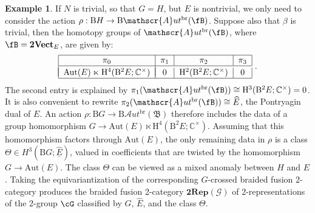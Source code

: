 \documentclass[11pt,reqno]{amsart}
\DeclareMathOperator{\br}{br}
\newcommand{\tVect}{\mathbf{2Vect}}
\newcommand{\sAut}{\mathscr{A}ut}
\newcommand{\rH}{\mathrm{H}}
\newcommand{\rB}{\mathrm{B}}
\numberwithin{equation}{section}
\theoremstyle{plain}
\theoremstyle{definition}
\newtheorem{ex}[equation]{Example}
\begin{document}
\begin{ex}
If $N$ is trivial, so that $G=H$, but $E$ is nontrivial, we only need to consider the action $\rho:\rB H \rightarrow \rB\sAut^{\br}(\fB)$. Suppose also that $\beta$ is trivial, then the homotopy groups of $\sAut^{\br}(\fB)$, where $\fB = \tVect_E$, are given by:
\begin{equation}\label{eq:groupsAutB}
    \begin{tabular}{|c|c|c|c|c|}
\hline
$\pi_0$ & $\pi_1$ & $\pi_2$ & $\pi_3$\\
\hline \\[-1em]
$\mathrm{Aut}(E)\ltimes \rH^4(\rB^2 E;\mathbb{C}^\times)$ & $0$ &  $\rH^2(\rB^2 E;\mathbb{C}^\times)$ & $0$ \\
\hline 
\end{tabular}\vspace{4mm}\,\,.
\end{equation}
The second entry is explained by $\pi_1(\sAut^{\br}(\fB))\cong\rH^3(\rB^2 E; \mathbb{C}^\times) = 0$. It is also convenient to rewrite $\pi_2(\sAut^{\br}(\fB))\cong\widehat{E}$, the Pontryagin dual of $E$. An action $\rho: \rB G \rightarrow  \mathrm{B}\mathscr{A}ut^{\br}(\mathfrak{B})$ therefore includes the data of a group homomorphism $G\rightarrow \mathrm{Aut}(E)\ltimes \rH^4(\rB^2 E;\mathbb{C}^\times)$. Assuming that this homomorphism factors through $\mathrm{Aut}(E)$, the only remaining data in $\rho$ is a class $\Theta \in H^3(\rB G;\underline{\widehat{E}})$, valued in coefficients that are twisted by the homomorphism $G\rightarrow \mathrm{Aut}(E)$. The class $\Theta$ can be viewed as a mixed anomaly between $H$ and $\widehat{E}$. Taking the equivariantization of the corresponding $G$-crossed braided fusion 2-category produces the braided fusion 2-category $\mathbf{2Rep}(\mathcal{G})$ of 2-representations of the 2-group $\cG$ classified by $G$, $\widehat{E}$, and the class $\Theta$.
\end{ex}
\end{document}
